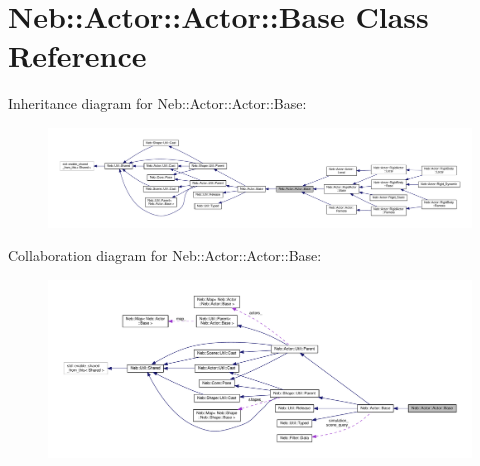 \hypertarget{classNeb_1_1Actor_1_1Actor_1_1Base}{\section{Neb\-:\-:Actor\-:\-:Actor\-:\-:Base Class Reference}
\label{classNeb_1_1Actor_1_1Actor_1_1Base}
}


Inheritance diagram for Neb\-:\-:Actor\-:\-:Actor\-:\-:Base\-:
\nopagebreak
\begin{figure}[H]
\begin{center}
\leavevmode
\includegraphics[width=350pt]{classNeb_1_1Actor_1_1Actor_1_1Base__inherit__graph}
\end{center}
\end{figure}


Collaboration diagram for Neb\-:\-:Actor\-:\-:Actor\-:\-:Base\-:
\nopagebreak
\begin{figure}[H]
\begin{center}
\leavevmode
\includegraphics[width=350pt]{classNeb_1_1Actor_1_1Actor_1_1Base__coll__graph}
\end{center}
\end{figure}

